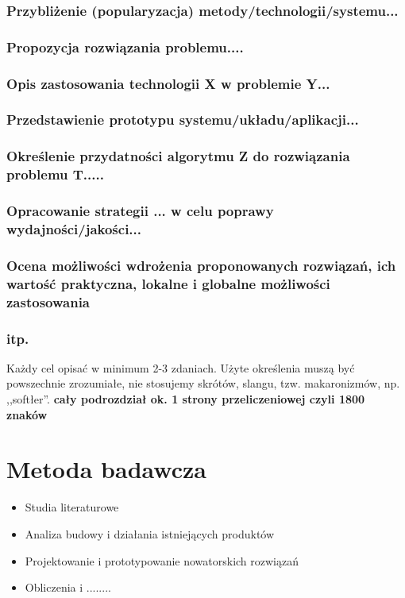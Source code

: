 \documentclass[12pt]{report}
\begin{document}
\subsubsection{Przybliżenie (popularyzacja) metody/technologii/systemu...}
\subsubsection{Propozycja rozwiązania problemu....}
\subsubsection{Opis zastosowania technologii X w problemie Y...}
\subsubsection{Przedstawienie prototypu systemu/układu/aplikacji...}
\subsubsection{Określenie przydatności algorytmu Z do rozwiązania problemu T.....
}
\subsubsection{Opracowanie strategii ... w celu poprawy wydajności/jakości...}
\subsubsection{Ocena możliwości wdrożenia proponowanych rozwiązań, ich wartość
praktyczna, lokalne i globalne możliwości zastosowania}
\subsubsection{itp.}

Każdy cel opisać w minimum 2-3 zdaniach. Użyte określenia muszą być powszechnie
zrozumiałe, nie stosujemy skrótów, slangu,  tzw. makaronizmów, np. ,,softłer''.
{\bf cały podrozdział ok. 1 strony przeliczeniowej czyli 1800 znaków}

\section{Metoda badawcza}
\begin{itemize}
\item Studia literaturowe
\item Analiza budowy i działania istniejących produktów
\item Projektowanie i prototypowanie nowatorskich rozwiązań 
\item Obliczenia i ........
\end{itemize}
\end{document}
